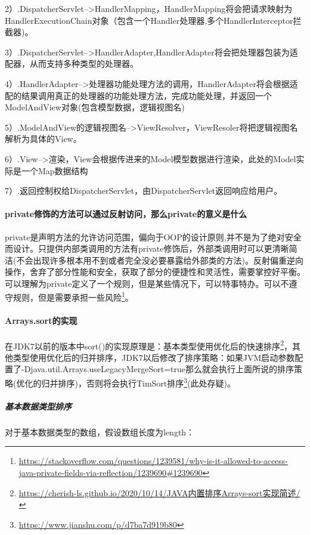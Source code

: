 \documentclass[../../../interview-questions.tex]{subfiles}
\begin{document}
2）.DispatcherServlet-->HandlerMapping，HandlerMapping将会把请求映射为HandlerExecutionChain对象（包含一个Handler处理器,多个HandlerInterceptor拦截器)。

3）.DispatcherServlet-->HandlerAdapter,HandlerAdapter将会把处理器包装为适配器，从而支持多种类型的处理器。

4）.HandlerAdapter-->处理器功能处理方法的调用，HandlerAdapter将会根据适配的结果调用真正的处理器的功能处理方法，完成功能处理，并返回一个ModelAndView对象(包含模型数据，逻辑视图名)

5）.ModelAndView的逻辑视图名-->ViewResolver，ViewResoler将把逻辑视图名解析为具体的View。

6）.View-->渲染，View会根据传进来的Model模型数据进行渲染，此处的Model实际是一个Map数据结构

7）.返回控制权给DispatcherServlet，由DispatcherServlet返回响应给用户。

\paragraph{private修饰的方法可以通过反射访问，那么private的意义是什么}

private是声明方法的允许访问范围，偏向于OOP的设计原则,并不是为了绝对安全而设计。只提供内部类调用的方法有private修饰后，外部类调用时可以更清晰简洁(不会出现许多根本用不到或者完全没必要暴露给外部类的方法)。反射偏重逆向操作，舍弃了部分性能和安全，获取了部分的便捷性和灵活性，需要掌控好平衡。可以理解为private定义了一个规则，但是某些情况下，可以特事特办。可以不遵守规则，但是需要承担一些风险\footnote{\url{https://stackoverflow.com/questions/1239581/why-is-it-allowed-to-access-java-private-fields-via-reflection/1239690\#1239690}}。


\paragraph{Arrays.sort的实现}

在JDK7以前的版本中sort()的实现原理是：基本类型使用优化后的快速排序\footnote{\url{https://cherish-ls.github.io/2020/10/14/JAVA内置排序Arrays-sort实现简述/}}，其他类型使用优化后的归并排序，JDK7以后修改了排序策略：如果JVM启动参数配置了-Djava.util.Arrays.useLegacyMergeSort=true那么就会执行上面所说的排序策略(优化的归并排序)，否则将会执行TimSort排序\footnote{\url{https://www.jianshu.com/p/d7ba7d919b80}}(此处存疑)。

\subparagraph{基本数据类型排序}

对于基本数据类型的数组，假设数组长度为length：
\end{document}
